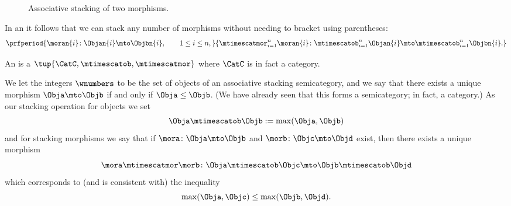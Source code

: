 \begin{figure}[h!]
    \centering
    \caption{Associative stacking of two morphisms.}
    \label{fig:double-stacked-new}
\end{figure}

\begin{remark}
    In an   it follows that we can stack any number of morphisms without needing to bracket using parentheses:
    \begin{equation}
        \prfperiod{
            \moran{i} \colon \Objan{i} \mto \Objbn{i}, \qquad 1 \leq i \leq n,
        }{
            \mtimescatmor_{i=1}^n \moran{i} \colon \mtimescatob_{i=1}^n \Objan{i} \mto \mtimescatob_{i=1}^n \Objbn{i}.
        }
    \end{equation}
\end{remark}

\begin{ctdefinition}
    \label{def:assoc-stacking-cat}
    An  is a  $\tup{\CatC, \mtimescatob, \mtimescatmor}$ where $\CatC$ is in fact a category.
\end{ctdefinition}

\begin{example}\label{ex:assoc-stacking-semicat-integers-max}
    We let the integers $\wnumbers$ to be the set of objects of an associative stacking semicategory, and we say that there exists a unique morphism $\Obja \mto \Objb$ if and only if $\Obja \leq \Objb$.
    (We have already seen that this forms a semicategory; in fact, a category.) As our stacking operation for objects we set
    \begin{equation}
        \Obja \mtimescatob \Objb := \max(\Obja, \Objb)
    \end{equation}
    and for stacking morphisms we say that if $\mora \colon \Obja \mto \Objb$ and $\morb \colon \Objc \mto \Objd$ exist, then there exists a unique morphism
    \begin{equation}
        \mora \mtimescatmor \morb \colon \Obja \mtimescatob \Objc \mto \Objb \mtimescatob \Objd
    \end{equation}
    which corresponds to (and is consistent with) the inequality
    \begin{equation}
        \max(\Obja, \Objc) \leq \max(\Objb, \Objd).
    \end{equation}
\end{example}

